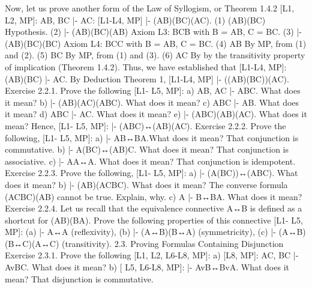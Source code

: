 Now, let us prove another form of the Law of Syllogism, or Theorem 1.4.2 [L1, L2, MP]: A\IMPLIES B, B\IMPLIES C |-
A\IMPLIES C:
[L1-L4, MP] |- (A\IMPLIES B)\AND (B\IMPLIES C)\IMPLIES (A\IMPLIES C).
(1) (A\IMPLIES B)\AND (B\IMPLIES C) Hypothesis.
(2) |- (A\IMPLIES B)\AND (B\IMPLIES C)\IMPLIES (A\IMPLIES B) Axiom L3: B\AND C\IMPLIES B with B = A\IMPLIES B, C =
                                    B\IMPLIES C.
(3) |- (A\IMPLIES B)\AND (B\IMPLIES C)\IMPLIES (B\IMPLIES C) Axiom L4: B\AND C\IMPLIES C with B = A\IMPLIES B, C =
                                    B\IMPLIES C.
(4) A\IMPLIES B By MP, from (1) and (2).
(5) B\IMPLIES C By MP, from (1) and (3).
(6) A\IMPLIES C By by the transitivity property of implication
         (Theorem 1.4.2).
Thus, we have established that [L1-L4, MP]: (A\IMPLIES B)\AND (B\IMPLIES C) |- A\IMPLIES C. By Deduction Theorem 1, [L1-L4,
MP] |- ((A\IMPLIES B)\AND (B\IMPLIES C))\IMPLIES (A\IMPLIES C).
Exercise 2.2.1. Prove the following [L1- L5, MP]:
a) A\IMPLIES B, A\IMPLIES C |- A\IMPLIES B\AND C. What does it mean?
b) |- (A\IMPLIES B)\AND (A\IMPLIES C)\IMPLIES (A\IMPLIES B\AND C). What does it mean?
c) A\IMPLIES B\AND C |- A\IMPLIES B. What does it mean?
d) A\IMPLIES B\AND C |- A\IMPLIES C. What does it mean?
e) |- (A\IMPLIES B\AND C)\IMPLIES (A\IMPLIES B)\AND (A\IMPLIES C). What does it mean?
Hence,
[L1- L5, MP]: |- (A\IMPLIES B\AND C)↔(A\IMPLIES B)\AND (A\IMPLIES C).
Exercise 2.2.2. Prove the following, [L1- L5, MP]:
a) |- A\AND B↔B\AND A.What does it mean? That conjunction is commutative.
b) |- A\AND (B\AND C)↔(A\AND B)\AND C. What does it mean? That conjunction is associative.
c) |- A\AND A↔A. What does it mean? That conjunction is idempotent.
Exercise 2.2.3. Prove the following, [L1- L5, MP]:
a) |- (A\IMPLIES (B\IMPLIES C))↔(A\AND B\IMPLIES C). What does it mean?
b) |- (A\IMPLIES B)\IMPLIES (A\AND C\IMPLIES B\AND C). What does it mean? The converse formula (A\AND C\IMPLIES B\AND C)\IMPLIES (A\IMPLIES B) cannot
be true. Explain, why.
c) A |- B↔B\AND A. What does it mean?
Exercise 2.2.4. Let us recall that the equivalence connective A↔B is defined as a shortcut for
(A\IMPLIES B)\AND (B\IMPLIES A). Prove the following properties of this connective [L1- L5, MP]:
(a) |- A↔A (reflexivity),
(b) |- (A↔B)\IMPLIES (B↔A) (symmetricity),
(c) |- (A↔B)\AND (B↔C)\IMPLIES (A↔C) (transitivity).
2.3. Proving Formulas Containing Disjunction
Exercise 2.3.1. Prove the following [L1, L2, L6-L8, MP]:
a) [L8, MP]: A\IMPLIES C, B\IMPLIES C |- AvB\IMPLIES C. What does it mean?
b) [ L5, L6-L8, MP]: |- AvB↔BvA. What does it mean? That disjunction is commutative.
